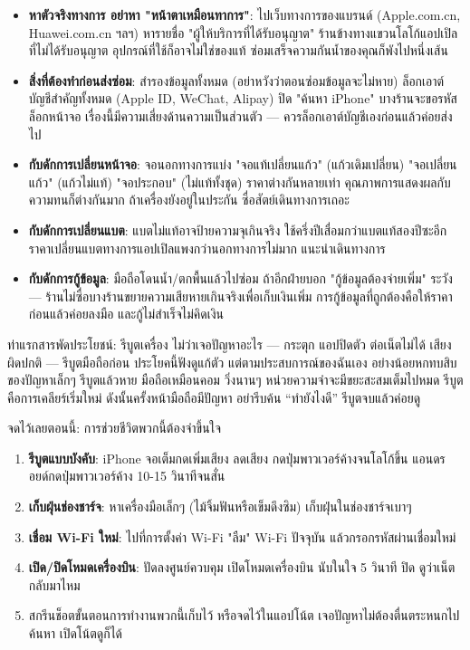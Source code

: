 \begin{itemize}
  \item \textbf{หาตัวจริงทางการ อย่าหา "หน้าตาเหมือนทาการ"}: ไปเว็บทางการของแบรนด์ (Apple.com.cn, Huawei.com.cn ฯลฯ) หารายชื่อ "ผู้ให้บริการที่ได้รับอนุญาต" ร้านข้างทางแขวนโลโก้แอปเปิลที่ไม่ได้รับอนุญาต อุปกรณ์ที่ใช้ก็อาจไม่ใช่ของแท้ ซ่อมเสร็จความกันน้ำของคุณก็พังไปหนึ่งเส้น
  \item \textbf{สิ่งที่ต้องทำก่อนส่งซ่อม}: สำรองข้อมูลทั้งหมด (อย่าหวังว่าตอนซ่อมข้อมูลจะไม่หาย) ล็อกเอาต์บัญชีสำคัญทั้งหมด (Apple ID, WeChat, Alipay) ปิด "ค้นหา iPhone" บางร้านจะขอรหัสล็อกหน้าจอ เรื่องนี้มีความเสี่ยงด้านความเป็นส่วนตัว — ควรล็อกเอาต์บัญชีเองก่อนแล้วค่อยส่งไป
  \item \textbf{กับดักการเปลี่ยนหน้าจอ}: จอนอกทางการแบ่ง "จอแท้เปลี่ยนแก้ว" (แก้วเดิมเปลี่ยน) "จอเปลี่ยนแก้ว" (แก้วไม่แท้) "จอประกอบ" (ไม่แท้ทั้งชุด) ราคาต่างกันหลายเท่า คุณภาพการแสดงผลกับความทนก็ต่างกันมาก ถ้าเครื่องยังอยู่ในประกัน ซื่อสัตย์เดินทางการเถอะ
  \item \textbf{กับดักการเปลี่ยนแบต}: แบตไม่แท้อาจป้ายความจุเกินจริง ใช้ครึ่งปีเสื่อมกว่าแบตแท้สองปีซะอีก ราคาเปลี่ยนแบตทางการแอปเปิลแพงกว่านอกทางการไม่มาก แนะนำเดินทางการ
  \item \textbf{กับดักการกู้ข้อมูล}: มือถือโดนน้ำ/ตกพื้นแล้วไปซ่อม ถ้าอีกฝ่ายบอก "กู้ข้อมูลต้องจ่ายเพิ่ม" ระวัง — ร้านไม่ซื่อบางร้านขยายความเสียหายเกินจริงเพื่อเก็บเงินเพิ่ม การกู้ข้อมูลที่ถูกต้องคือให้ราคาก่อนแล้วค่อยลงมือ และกู้ไม่สำเร็จไม่คิดเงิน
\end{itemize}

\begin{tcbwarn}{ท่าแรกสารพัดประโยชน์: รีบูตเครื่อง}
ไม่ว่าเจอปัญหาอะไร — กระตุก แอปปิดตัว ต่อเน็ตไม่ได้ เสียงผิดปกติ — รีบูตมือถือก่อน ประโยคนี้ฟังดูแก้ตัว แต่ตามประสบการณ์ของฉันเอง อย่างน้อยหกทบสิบของปัญหาเล็กๆ รีบูตแล้วหาย มือถือเหมือนคอม วิ่งนานๆ หน่วยความจำจะมีขยะสะสมเต็มไปหมด รีบูตคือการเคลียร์เริ่มใหม่ ดังนั้นครั้งหน้ามือถือมีปัญหา อย่ารีบค้น “ทำยังไงดี” รีบูตจบแล้วค่อยดู

\end{tcbwarn}

\begin{tcbpractice}{จดไว้เลยตอนนี้: การช่วยชีวิตพวกนี้ต้องจำขึ้นใจ}
\begin{enumerate}
  \item \textbf{รีบูตแบบบังคับ}: iPhone จอเต็มกดเพิ่มเสียง ลดเสียง กดปุ่มพาวเวอร์ค้างจนโลโก้ขึ้น แอนดรอยด์กดปุ่มพาวเวอร์ค้าง 10-15 วินาทีจนสั่น
  \item \textbf{เก็บฝุ่นช่องชาร์จ}: หาเครื่องมือเล็กๆ (ไม้จิ้มฟันหรือเข็มดึงซิม) เก็บฝุ่นในช่องชาร์จเบาๆ
  \item \textbf{เชื่อม Wi-Fi ใหม่}: ไปที่การตั้งค่า Wi-Fi "ลืม" Wi-Fi ปัจจุบัน แล้วกรอกรหัสผ่านเชื่อมใหม่
  \item \textbf{เปิด/ปิดโหมดเครื่องบิน}: ปัดลงศูนย์ควบคุม เปิดโหมดเครื่องบิน นับในใจ 5 วินาที ปิด ดูว่าเน็ตกลับมาไหม
  \item สกรีนช็อตขั้นตอนการทำงานพวกนี้เก็บไว้ หรือจดไว้ในแอปโน้ต เจอปัญหาไม่ต้องตื่นตระหนกไปค้นหา เปิดโน้ตดูก็ได้
\end{enumerate}

\end{tcbpractice}
